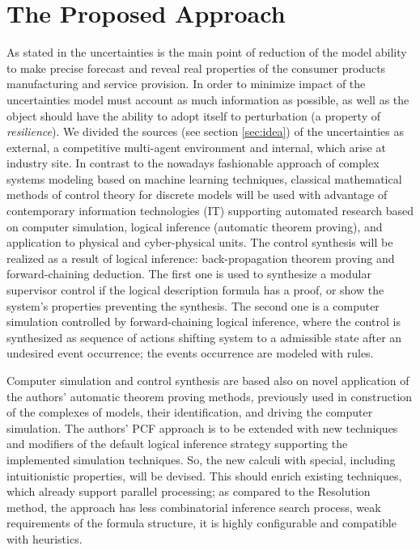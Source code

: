 \documentclass[conference]{IEEEtran}
\begin{document}
\section{The Proposed Approach}
\label{sec:methods}


As stated in \cite{b6} the uncertainties is the main point of reduction of the model ability to make precise forecast and reveal real properties of the consumer products manufacturing and service provision. In order to minimize impact of the uncertainties model must account as much information as possible, as well as the object should have the ability to adopt itself to perturbation (a property of \emph{resilience}).  We divided the sources (see section \ref{sec:idea}) of the uncertainties as external, a competitive multi-agent environment and internal, which arise at industry site.  In contrast to the nowadays fashionable approach of complex systems modeling based on machine learning techniques, classical mathematical methods of control theory for discrete models will be used with advantage of contemporary information technologies (IT) supporting automated research based on computer simulation, logical inference (automatic theorem proving), and application to physical and cyber-physical units.  The control synthesis will be realized as a result of logical inference: back-propagation theorem proving and forward-chaining deduction.  The first one is used to synthesize a modular supervisor control if the logical description formula has a proof, or show the system's properties preventing the synthesis.  The second one is a computer simulation controlled by forward-chaining logical inference, where the control is synthesized as sequence of actions shifting system to a admissible state after an undesired event occurrence; the events occurrence are modeled with rules.

Computer simulation and control synthesis are based also on novel application of the authors’ automatic theorem proving methods, previously used in construction of the complexes of models, their identification, and driving the computer simulation. The authors’ PCF approach is to be extended with new techniques and modifiers of the default logical inference strategy supporting the implemented simulation techniques. So, the new calculi with special, including intuitionistic properties, will be devised. This should enrich existing techniques, which already support parallel processing; as compared to the Resolution method, the approach has less combinatorial inference search process, weak requirements of the formula structure, it is highly configurable and compatible with heuristics.
\end{document}
